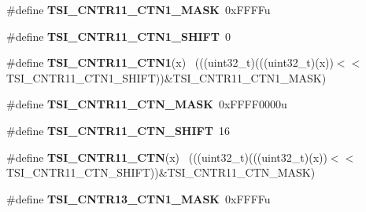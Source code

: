 \begin{DoxyCompactItemize}
\item 
\hypertarget{group___t_s_i___register___masks_ga20e6e5cb203746144a70994cf2b686ef}{}\#define {\bfseries T\+S\+I\+\_\+\+C\+N\+T\+R11\+\_\+\+C\+T\+N1\+\_\+\+M\+A\+S\+K}~0x\+F\+F\+F\+Fu\label{group___t_s_i___register___masks_ga20e6e5cb203746144a70994cf2b686ef}

\item 
\hypertarget{group___t_s_i___register___masks_gad389afd656e4be5c3a0d57d32a401db5}{}\#define {\bfseries T\+S\+I\+\_\+\+C\+N\+T\+R11\+\_\+\+C\+T\+N1\+\_\+\+S\+H\+I\+F\+T}~0\label{group___t_s_i___register___masks_gad389afd656e4be5c3a0d57d32a401db5}

\item 
\hypertarget{group___t_s_i___register___masks_ga5603c5277384add87a5972f0b2360395}{}\#define {\bfseries T\+S\+I\+\_\+\+C\+N\+T\+R11\+\_\+\+C\+T\+N1}(x)                                          ~(((uint32\+\_\+t)(((uint32\+\_\+t)(x))$<$$<$T\+S\+I\+\_\+\+C\+N\+T\+R11\+\_\+\+C\+T\+N1\+\_\+\+S\+H\+I\+F\+T))\&T\+S\+I\+\_\+\+C\+N\+T\+R11\+\_\+\+C\+T\+N1\+\_\+\+M\+A\+S\+K)\label{group___t_s_i___register___masks_ga5603c5277384add87a5972f0b2360395}

\item 
\hypertarget{group___t_s_i___register___masks_ga12ceb148771123d3f985c95857174665}{}\#define {\bfseries T\+S\+I\+\_\+\+C\+N\+T\+R11\+\_\+\+C\+T\+N\+\_\+\+M\+A\+S\+K}~0x\+F\+F\+F\+F0000u\label{group___t_s_i___register___masks_ga12ceb148771123d3f985c95857174665}

\item 
\hypertarget{group___t_s_i___register___masks_ga72c3ce0896c8ead8cf9cb28dc3bbf082}{}\#define {\bfseries T\+S\+I\+\_\+\+C\+N\+T\+R11\+\_\+\+C\+T\+N\+\_\+\+S\+H\+I\+F\+T}~16\label{group___t_s_i___register___masks_ga72c3ce0896c8ead8cf9cb28dc3bbf082}

\item 
\hypertarget{group___t_s_i___register___masks_ga1a9e70bef0e36f21e2432aef2cc97fc7}{}\#define {\bfseries T\+S\+I\+\_\+\+C\+N\+T\+R11\+\_\+\+C\+T\+N}(x)                                            ~(((uint32\+\_\+t)(((uint32\+\_\+t)(x))$<$$<$T\+S\+I\+\_\+\+C\+N\+T\+R11\+\_\+\+C\+T\+N\+\_\+\+S\+H\+I\+F\+T))\&T\+S\+I\+\_\+\+C\+N\+T\+R11\+\_\+\+C\+T\+N\+\_\+\+M\+A\+S\+K)\label{group___t_s_i___register___masks_ga1a9e70bef0e36f21e2432aef2cc97fc7}

\item 
\hypertarget{group___t_s_i___register___masks_ga9671deb8a78c5ef99068b0244f19f125}{}\#define {\bfseries T\+S\+I\+\_\+\+C\+N\+T\+R13\+\_\+\+C\+T\+N1\+\_\+\+M\+A\+S\+K}~0x\+F\+F\+F\+Fu\label{group___t_s_i___register___masks_ga9671deb8a78c5ef99068b0244f19f125}


\end{DoxyCompactItemize}
